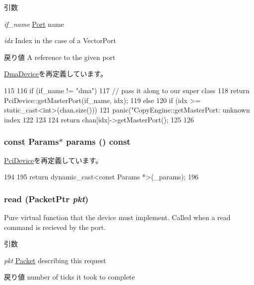 \begin{DoxyParams}{引数}
\item[{\em if\_\-name}]\hyperlink{classPort}{Port} name \item[{\em idx}]Index in the case of a VectorPort\end{DoxyParams}
\begin{DoxyReturn}{戻り値}
A reference to the given port 
\end{DoxyReturn}


\hyperlink{classDmaDevice_adc4e675e51defbdd1e354dac729d0703}{DmaDevice}を再定義しています。


\begin{DoxyCode}
115 {
116     if (if_name != "dma") {
117         // pass it along to our super class
118         return PciDevice::getMasterPort(if_name, idx);
119     } else {
120         if (idx >= static_cast<int>(chan.size())) {
121             panic("CopyEngine::getMasterPort: unknown index %
122         }
123 
124         return chan[idx]->getMasterPort();
125     }
126 }
\end{DoxyCode}
\hypertarget{classCopyEngine_acd3c3feb78ae7a8f88fe0f110a718dff}{
\subsubsection[{params}]{\setlength{\rightskip}{0pt plus 5cm}const {\bf Params}$\ast$ params () const}}
\label{classCopyEngine_acd3c3feb78ae7a8f88fe0f110a718dff}


\hyperlink{classPciDevice_acd3c3feb78ae7a8f88fe0f110a718dff}{PciDevice}を再定義しています。


\begin{DoxyCode}
194     {
195         return dynamic_cast<const Params *>(_params);
196     }
\end{DoxyCode}
\hypertarget{classCopyEngine_a613ec7d5e1ec64f8d21fec78ae8e568e}{
\subsubsection[{read}]{ read ({\bf PacketPtr} {\em pkt})}}
\label{classCopyEngine_a613ec7d5e1ec64f8d21fec78ae8e568e}
Pure virtual function that the device must implement. Called when a read command is recieved by the port. 
\begin{DoxyParams}{引数}
\item[{\em pkt}]\hyperlink{classPacket}{Packet} describing this request \end{DoxyParams}
\begin{DoxyReturn}{戻り値}
number of ticks it took to complete 
\end{DoxyReturn}



